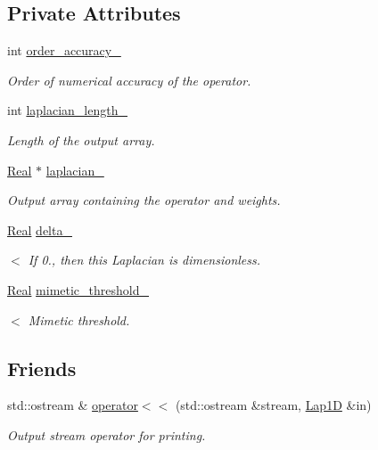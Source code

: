 \subsection*{Private Attributes}
\begin{DoxyCompactItemize}
\item 
int \hyperlink{classmtk_1_1Lap1D_a35d34c085b9cf6f9961a699dfb02fea6}{order\+\_\+accuracy\+\_\+}
\begin{DoxyCompactList}\small\item\em Order of numerical accuracy of the operator. \end{DoxyCompactList}\item 
int \hyperlink{classmtk_1_1Lap1D_a05578b0729f2bb4fe8bb442fc555fa80}{laplacian\+\_\+length\+\_\+}
\begin{DoxyCompactList}\small\item\em Length of the output array. \end{DoxyCompactList}\item 
\hyperlink{group__c01-roots_gac080bbbf5cbb5502c9f00405f894857d}{Real} $\ast$ \hyperlink{classmtk_1_1Lap1D_a64a3977527c00b4ef994d1bd549f82fd}{laplacian\+\_\+}
\begin{DoxyCompactList}\small\item\em Output array containing the operator and weights. \end{DoxyCompactList}\item 
\hyperlink{group__c01-roots_gac080bbbf5cbb5502c9f00405f894857d}{Real} \hyperlink{classmtk_1_1Lap1D_a0feafd7b78e62be8644503d14c0204d9}{delta\+\_\+}
\begin{DoxyCompactList}\small\item\em $<$ If 0., then this Laplacian is dimensionless. \end{DoxyCompactList}\item 
\hyperlink{group__c01-roots_gac080bbbf5cbb5502c9f00405f894857d}{Real} \hyperlink{classmtk_1_1Lap1D_a20dce13067774c64dff892323d9c586e}{mimetic\+\_\+threshold\+\_\+}
\begin{DoxyCompactList}\small\item\em $<$ Mimetic threshold. \end{DoxyCompactList}\end{DoxyCompactItemize}
\subsection*{Friends}
\begin{DoxyCompactItemize}
\item 
std\+::ostream \& \hyperlink{classmtk_1_1Lap1D_a235390479381d4e95163674968a1ca7c}{operator$<$$<$} (std\+::ostream \&stream, \hyperlink{classmtk_1_1Lap1D}{Lap1\+D} \&in)
\begin{DoxyCompactList}\small\item\em Output stream operator for printing. \end{DoxyCompactList}\end{DoxyCompactItemize}


